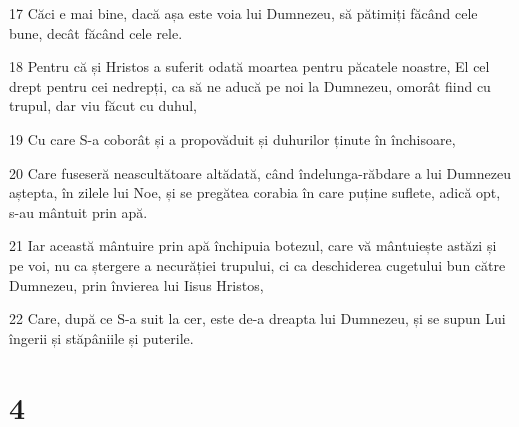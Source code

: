 \par 17 Căci e mai bine, dacă așa este voia lui Dumnezeu, să pătimiți făcând cele bune, decât făcând cele rele.
\par 18 Pentru că și Hristos a suferit odată moartea pentru păcatele noastre, El cel drept pentru cei nedrepți, ca să ne aducă pe noi la Dumnezeu, omorât fiind cu trupul, dar viu făcut cu duhul,
\par 19 Cu care S-a coborât și a propovăduit și duhurilor ținute în închisoare,
\par 20 Care fuseseră neascultătoare altădată, când îndelunga-răbdare a lui Dumnezeu aștepta, în zilele lui Noe, și se pregătea corabia în care puține suflete, adică opt, s-au mântuit prin apă.
\par 21 Iar această mântuire prin apă închipuia botezul, care vă mântuiește astăzi și pe voi, nu ca ștergere a necurăției trupului, ci ca deschiderea cugetului bun către Dumnezeu, prin învierea lui Iisus Hristos,
\par 22 Care, după ce S-a suit la cer, este de-a dreapta lui Dumnezeu, și se supun Lui îngerii și stăpâniile și puterile.

\chapter{4}

